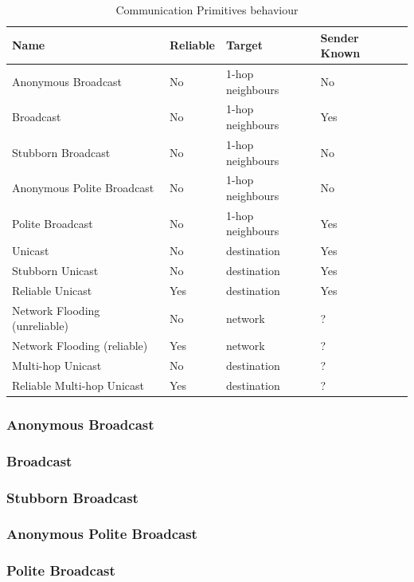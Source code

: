 \begin{table}[H]
	\centering
	\begin{tabular}{ | l | l | l | l | }
		\hline
		Name & Reliable & Target & Sender Known\\
		\hline
		Anonymous Broadcast & No & 1-hop neighbours & No\\
		Broadcast & No & 1-hop neighbours & Yes\\
		Stubborn Broadcast & No & 1-hop neighbours & No\\
		Anonymous Polite Broadcast & No & 1-hop neighbours & No\\
		Polite Broadcast & No & 1-hop neighbours & Yes\\
		Unicast & No & destination & Yes\\
		Stubborn Unicast & No & destination & Yes\\
		Reliable Unicast & Yes & destination & Yes\\
		Network Flooding (unreliable) & No & network & ?\\
		Network Flooding (reliable) & Yes & network & ?\\
		Multi-hop Unicast & No & destination & ?\\
		Reliable Multi-hop Unicast & Yes & destination & ?\\
		\hline
	\end{tabular}
	\caption{Communication Primitives behaviour}
\end{table}

\subsubsection{Anonymous Broadcast}

\subsubsection{Broadcast}

\subsubsection{Stubborn Broadcast}

\subsubsection{Anonymous Polite Broadcast}

\subsubsection{Polite Broadcast}

